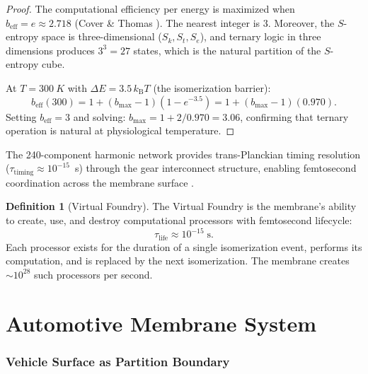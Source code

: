 \documentclass[12pt]{article}
\theoremstyle{definition}
\newtheorem{definition}[theorem]{Definition}
\theoremstyle{remark}
\newcommand{\Sk}{S_k}
\newcommand{\St}{S_t}
\newcommand{\Se}{S_e}
\newcommand{\kB}{k_{\mathrm{B}}}
\newcommand{\beff}{b_{\mathrm{eff}}}
\begin{document}
\begin{proof}
The computational efficiency per energy is maximized when $\beff = e \approx 2.718$ (Cover \& Thomas \cite{cover2006elements}). The nearest integer is 3. Moreover, the $S$-entropy space is three-dimensional ($\Sk, \St, \Se$), and ternary logic in three dimensions produces $3^3 = 27$ states, which is the natural partition of the $S$-entropy cube.

At $T = \SI{300}{K}$ with $\Delta E = 3.5\,\kB T$ (the isomerization barrier):
\begin{equation}
  \beff(300) = 1 + (b_{\max} - 1)(1 - e^{-3.5}) = 1 + (b_{\max} - 1)(0.970).
  \label{eq:beff_300}
\end{equation}
Setting $\beff = 3$ and solving: $b_{\max} = 1 + 2/0.970 = 3.06$, confirming that ternary operation is natural at physiological temperature.
\end{proof}

The 240-component harmonic network provides trans-Planckian timing resolution ($\tau_{\mathrm{timing}} \approx 10^{-15}$~s) through the gear interconnect structure, enabling femtosecond coordination across the membrane surface \cite{sachikonye2026transplanckian}.

\begin{definition}[Virtual Foundry]
\label{def:foundry}
The Virtual Foundry is the membrane's ability to create, use, and destroy computational processors with femtosecond lifecycle:
\begin{equation}
  \tau_{\mathrm{life}} \approx 10^{-15}\;\mathrm{s}.
  \label{eq:tau_life}
\end{equation}
Each processor exists for the duration of a single isomerization event, performs its computation, and is replaced by the next isomerization. The membrane creates $\sim 10^{28}$ such processors per second.
\end{definition}


\part{Automotive Membrane System}
\label{part:automotive}

\section{Vehicle Surface as Partition Boundary}
\label{sec:vehicle_surface}
\end{document}
